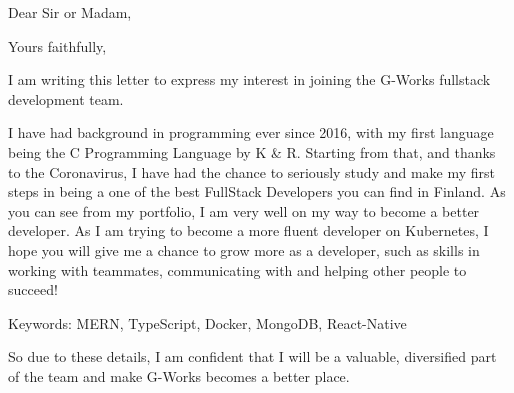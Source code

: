 \documentclass[11pt,a4paper,sans]{moderncv}
\begin{document}
  \clearpage

  \date{February 1, 2021}
  \opening{Dear Sir or Madam,}
  \closing{Yours faithfully,}
  \makelettertitle

  I am writing this letter to express my interest in joining the G-Works
  fullstack development team.

  I have had background in programming ever since 2016, with my
  first language being the C Programming Language by K \& R. Starting
  from that, and thanks to the Coronavirus, I have had the chance
  to seriously study and make my first steps in being a
  one of the best FullStack Developers you can find in Finland.
  As you can see from my portfolio, I am very well on my way to become
  a better developer. As I am trying to become a more fluent developer on Kubernetes,
  I hope you will give me a chance to grow more as a developer,
  such as skills in working with teammates, communicating with and helping other
  people to succeed!

  Keywords: MERN, TypeScript, Docker, MongoDB, React-Native

  So due to these details, I am confident that I will be a valuable, diversified
  part of the team and make G-Works becomes a better place.

  \makeletterclosing
\end{document}
